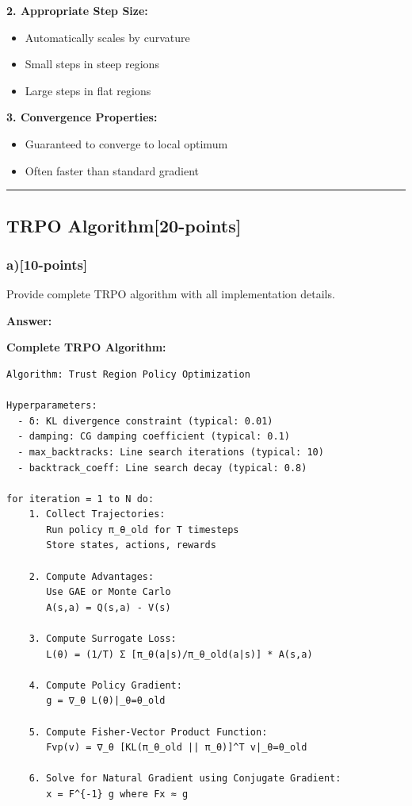 \documentclass[12pt]{article}
\begin{document}
{{\textbf{2. Appropriate Step Size:}
\begin{itemize}
\item Automatically scales by curvature
\item Small steps in steep regions
\item Large steps in flat regions
\end{itemize}

\textbf{3. Convergence Properties:}
\begin{itemize}
\item Guaranteed to converge to local optimum
\item Often faster than standard gradient
\end{itemize}

\noindent\rule{\textwidth}{0.2pt}

\subsection{TRPO Algorithm[20-points]}
\subsubsection{a)[10-points]} Provide complete TRPO algorithm with all implementation details.

\textbf{Answer:}

\textbf{Complete TRPO Algorithm:}

\begin{verbatim}
Algorithm: Trust Region Policy Optimization

Hyperparameters:
  - δ: KL divergence constraint (typical: 0.01)
  - damping: CG damping coefficient (typical: 0.1)
  - max_backtracks: Line search iterations (typical: 10)
  - backtrack_coeff: Line search decay (typical: 0.8)

for iteration = 1 to N do:
    1. Collect Trajectories:
       Run policy π_θ_old for T timesteps
       Store states, actions, rewards

    2. Compute Advantages:
       Use GAE or Monte Carlo
       A(s,a) = Q(s,a) - V(s)

    3. Compute Surrogate Loss:
       L(θ) = (1/T) Σ [π_θ(a|s)/π_θ_old(a|s)] * A(s,a)

    4. Compute Policy Gradient:
       g = ∇_θ L(θ)|_θ=θ_old

    5. Compute Fisher-Vector Product Function:
       Fvp(v) = ∇_θ [KL(π_θ_old || π_θ)]^T v|_θ=θ_old

    6. Solve for Natural Gradient using Conjugate Gradient:
       x = F^{-1} g where Fx ≈ g


\end{verbatim}}}
\end{document}
